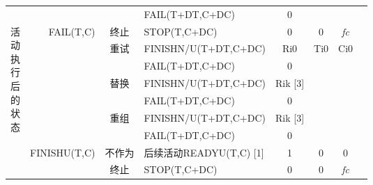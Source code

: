 \begin{table}[htbp]
\begin{tabular}{rrrrrrrr}
        \multicolumn{1}{c}{} &       & \multicolumn{1}{c}{} & \multicolumn{1}{l}{FAIL(T+DT,C+DC)} & \multicolumn{1}{c}{0} & \multicolumn{1}{c}{} & \multicolumn{1}{c}{} \\
        \multicolumn{1}{c}{\multirow{11}[22]{*}{\parbox{1em}{活\\动\\执\\行\\后\\的\\状\\态}}} & \multirow{7}[14]{*}{FAIL(T,C)} & \multicolumn{1}{c}{终止} & \multicolumn{1}{l}{STOP(T,C+DC)} & \multicolumn{1}{c}{0} & \multicolumn{1}{c}{0} & \multicolumn{1}{c}{\textit{fc}} \\
        \multicolumn{1}{c}{} &       & \multicolumn{1}{c}{\multirow{2}[4]{*}{重试}} & \multicolumn{1}{l}{FINISHN/U(T+DT,C+DC)} & \multicolumn{1}{c}{Ri0} & \multicolumn{1}{c}{\multirow{2}[4]{*}{Ti0}} & \multicolumn{1}{c}{\multirow{2}[4]{*}{Ci0}} \\
        \multicolumn{1}{c}{} &       & \multicolumn{1}{c}{} & \multicolumn{1}{l}{FAIL(T+DT,C+DC)} & \multicolumn{1}{c}{0} & \multicolumn{1}{c}{} & \multicolumn{1}{c}{} \\
        \multicolumn{1}{c}{} &       & \multicolumn{1}{c}{\multirow{2}[4]{*}{替换}} & \multicolumn{1}{l}{FINISHN/U(T+DT,C+DC)} & \multicolumn{1}{c}{Rik  [3]} & \multicolumn{1}{c}{\multirow{2}[4]{*}{\textit{}}} & \multicolumn{1}{c}{\multirow{2}[4]{*}{\textit{}}} \\
        \multicolumn{1}{c}{} &       & \multicolumn{1}{c}{} & \multicolumn{1}{l}{FAIL(T+DT,C+DC)} & \multicolumn{1}{c}{0} & \multicolumn{1}{c}{} & \multicolumn{1}{c}{} \\
        \multicolumn{1}{c}{} &       & \multicolumn{1}{c}{\multirow{2}[4]{*}{重组}} & \multicolumn{1}{l}{FINISHN/U(T+DT,C+DC)} & \multicolumn{1}{c}{Rik  [3]} & \multirow{2}[4]{*}{\textit{}} & \multirow{2}[4]{*}{\textit{}} \\
        \multicolumn{1}{c}{} &       & \multicolumn{1}{c}{} & \multicolumn{1}{l}{FAIL(T+DT,C+DC)} & \multicolumn{1}{c}{0} &       &  \\
        \multicolumn{1}{c}{} & \multirow{3}[6]{*}{FINISHU(T,C)} & \multicolumn{1}{c}{不作为} & \multicolumn{1}{l}{后续活动READYU(T,C) [1]} & \multicolumn{1}{c}{1} & \multicolumn{1}{c}{0} & \multicolumn{1}{c}{0} \\
        \multicolumn{1}{c}{} &       & \multicolumn{1}{c}{终止} & \multicolumn{1}{l}{STOP(T,C+DC)} & \multicolumn{1}{c}{0} & \multicolumn{1}{c}{0} & \multicolumn{1}{c}{\textit{fc}} \\

\end{tabular}
\end{table}
